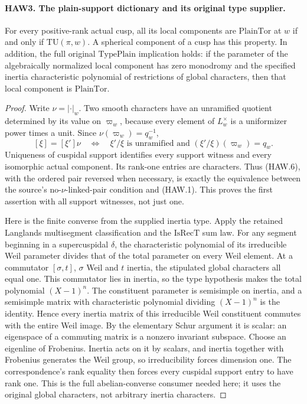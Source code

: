 \documentclass[11pt,a4paper]{article}
\numberwithin{equation}{section}
\theoremstyle{remark}\newtheorem{remark}[theorem]{Remark}
\begin{document}
\paragraph{HAW3. The plain-support dictionary and its original type supplier.}
\label{claim:HAW3}
For every positive-rank actual cusp, all its local components
are $\mathrm{PlainTor}$ at $w$ if and only if
$\mathrm{TU}(\pi,w)$.  A spherical component of a cusp has
this property.  In addition, the full original
$\mathrm{TypePlain}$ implication holds: if the parameter of
the algebraically normalized local component has zero
monodromy and the specified inertia characteristic polynomial
of restrictions of global characters, then that local
component is $\mathrm{PlainTor}$.
\begin{proof}
Write $\nu=|\cdot|_w$.  Two smooth characters have an
unramified quotient determined by its value on $\varpi_w$,
because every element of $L_w^\times$ is a uniformizer power
times a unit.  Since $\nu(\varpi_w)=q_w^{-1}$,
\[
 [\xi]=[\xi']\nu
 \quad\Longleftrightarrow\quad
 \xi'/\xi\text{ is unramified and }
                       (\xi'/\xi)(\varpi_w)=q_w.
 \tag{HAW.6}
\]
Uniqueness of cuspidal support identifies every support witness
and every isomorphic actual component.  Its rank-one entries
are characters.  Thus (HAW.6), with the ordered pair reversed
when necessary, is exactly the equivalence between the source's
no-$\nu$-linked-pair condition and (HAW.1).  This proves the
first assertion with all support witnesses, not just one.

Here is the finite converse from the supplied inertia type.
Apply the retained Langlands multisegment classification and
the $\mathrm{IsRecT}$ sum law.  For any segment beginning in
a supercuspidal $\delta$, the characteristic polynomial of
its irreducible Weil parameter divides that of the total
parameter on every Weil element.  At a commutator
$[\sigma,t]$, $\sigma$ Weil and $t$ inertia, the stipulated
global characters all equal one.  This commutator lies in
inertia, so the type hypothesis makes the total polynomial
$(X-1)^n$.  The constituent parameter is semisimple on
inertia, and a semisimple matrix with characteristic polynomial
dividing $(X-1)^n$ is the identity.  Hence every inertia
matrix of this irreducible Weil constituent commutes with the
entire Weil image.  By the elementary Schur argument it is
scalar: an eigenspace of a commuting matrix is a nonzero
invariant subspace.  Choose an eigenline of Frobenius.  Inertia
acts on it by scalars, and inertia together with Frobenius
generates the Weil group, so irreducibility forces dimension
one.  The correspondence's rank equality then forces every
cuspidal support entry to have rank one.  This is the full
abelian-converse consumer needed here; it uses the original
global characters, not arbitrary inertia characters.


\end{proof}
\end{document}
